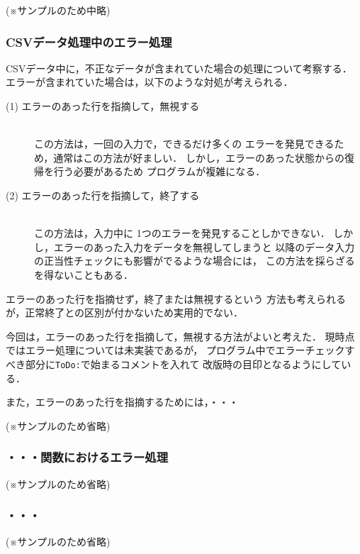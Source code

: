 \documentclass[a4j,11pt]{jarticle}
\begin{document}
(※サンプルのため中略)

\subsubsection{CSVデータ処理中のエラー処理}

CSVデータ中に，不正なデータが含まれていた場合の処理について考察する．
エラーが含まれていた場合は，以下のような対処が考えられる．

\begin{description} %
  \item[(1) エラーのあった行を指摘して，無視する]~\\
    この方法は，一回の入力で，できるだけ多くの
    エラーを発見できるため，通常はこの方法が好ましい．
    しかし，エラーのあった状態からの復帰を行う必要があるため
    プログラムが複雑になる．
  \item[(2) エラーのあった行を指摘して，終了する]~\\
    この方法は，入力中に 1つのエラーを発見することしかできない．
    しかし，エラーのあった入力をデータを無視してしまうと
    以降のデータ入力の正当性チェックにも影響がでるような場合には，
    この方法を採らざるを得ないこともある．
\end{description}

エラーのあった行を指摘せず，終了または無視するという
方法も考えられるが，正常終了との区別が付かないため実用的でない．

今回は，エラーのあった行を指摘して，無視する方法がよいと考えた．
現時点ではエラー処理については未実装であるが，
プログラム中でエラーチェックすべき部分に\verb|ToDo:|で始まるコメントを入れて
改版時の目印となるようにしている．

また，エラーのあった行を指摘するためには，・・・

(※サンプルのため省略)

\subsubsection{・・・関数におけるエラー処理}

(※サンプルのため省略)

\subsubsection{・・・}

(※サンプルのため省略)


\end{document}
